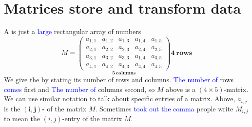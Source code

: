 \documentclass{ximera}
\begin{document}
\section{Matrices store and transform data}


A  is just a \textcolor{blue}{large} rectangular array of numbers
\[
M =
\underset{\displaystyle\boldsymbol{5}~\textbf{columns}}{\begin{pmatrix}
  a_{1,1} & a_{1,2} & a_{1,3} & a_{1,4} & a_{1,5} \\
  a_{2,1} & a_{2,2} & a_{2,3} & a_{2,4} & a_{2,5} \\
  a_{3,1} & a_{3,2} & a_{3,3} & a_{1,4} & a_{3,5} \\
  a_{4,1} & a_{4,2} & a_{4,3} & a_{4,4} & a_{4,5}
\end{pmatrix}}
\boldsymbol{4}~\textbf {rows}
\]
We give the  by stating its number of rows
and columns. \textcolor{blue}{The number of }rows \textcolor{blue}{comes} first and \textcolor{blue}{The number of } columns second, so $M$ above is
a $(4\times 5)$-matrix. We can use similar notation to talk about
specific entries of a matrix. Above, $a_{i,j}$ is the
$\boldsymbol{(i,j)}${\bf-} of the matrix $M$. Sometimes \textcolor{blue}{took out the comma}
people write $M_{i,j}$ to mean the $(i,j)$-entry of the matrix $M$.
\end{document}

